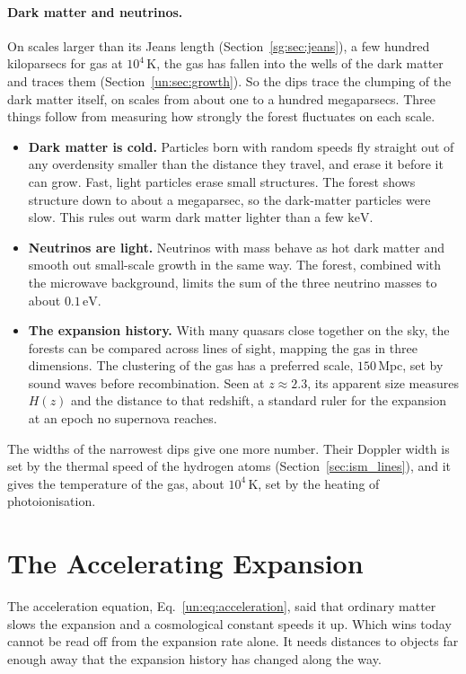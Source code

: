 \paragraph{Dark matter and neutrinos.} On scales larger than its Jeans length (Section~\ref{sg:sec:jeans}), a few hundred kiloparsecs for gas at $10^4\,\mathrm K$, the gas has fallen into the wells of the dark matter and traces them (Section~\ref{un:sec:growth}). So the dips trace the clumping of the dark matter itself, on scales from about one to a hundred megaparsecs. Three things follow from measuring how strongly the forest fluctuates on each scale.
\begin{itemize}
	\item \textbf{Dark matter is cold.} Particles born with random speeds fly straight out of any overdensity smaller than the distance they travel, and erase it before it can grow. Fast, light particles erase small structures. The forest shows structure down to about a megaparsec, so the dark-matter particles were slow. This rules out warm dark matter lighter than a few $\mathrm{keV}$.
	\item \textbf{Neutrinos are light.} Neutrinos with mass behave as hot dark matter and smooth out small-scale growth in the same way. The forest, combined with the microwave background, limits the sum of the three neutrino masses to about $0.1\,\mathrm{eV}$.
	\item \textbf{The expansion history.} With many quasars close together on the sky, the forests can be compared across lines of sight, mapping the gas in three dimensions. The clustering of the gas has a preferred scale, $150\,\mathrm{Mpc}$, set by sound waves before recombination. Seen at $z\approx2.3$, its apparent size measures $H(z)$ and the distance to that redshift, a standard ruler for the expansion at an epoch no supernova reaches.
\end{itemize}
The widths of the narrowest dips give one more number. Their Doppler width is set by the thermal speed of the hydrogen atoms (Section~\ref{sec:ism_lines}), and it gives the temperature of the gas, about $10^4\,\mathrm K$, set by the heating of photoionisation.

\section{The Accelerating Expansion}
\label{un:sec:acceleration}

The acceleration equation, Eq.~\eqref{un:eq:acceleration}, said that ordinary matter slows the expansion and a cosmological constant speeds it up. Which wins today cannot be read off from the expansion rate alone. It needs distances to objects far enough away that the expansion history has changed along the way.

